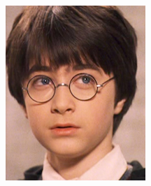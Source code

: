 \documentclass[10pt,twocolumn,letterpaper]{article}
\begin{document}
\begin{figure}[htbp]
{\begin{minipage}[b]{0.22\linewidth}
\includegraphics[width=0.99\linewidth]{img/real_world_photos/r4.png}
\end{minipage}
}
\end{figure}
\end{document}
